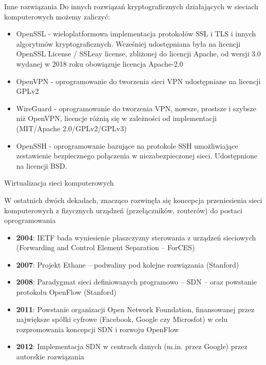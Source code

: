 \documentclass[aspectratio=169]{beamer}
\begin{document}
\begin{frame}{Inne rozwiązania}
    Do innych rozwiązań kryptograficznych działających w sieciach komputerowych możemy zaliczyć:
    \begin{itemize}
        \item OpenSSL - wieloplatformowa implementacja protokołów SSL i TLS i innych algorytmów kryptograficznych. Wcześniej udostępniana była na licencji OpenSSL License / SSLeay license, zbliżonej do licencji Apache, od wersji 3.0 wydanej w 2018 roku obowiązuje licencja Apache-2.0
        \item OpenVPN - oprogramowanie do tworzenia sieci VPN udostępniane na licencji GPLv2
        \item WireGuard - oprogramowanie do tworzenia VPN, nowsze, prostsze i szybsze niż OpenVPN, licencje różnią się w zależności od implementacji (MIT/Apache 2.0/GPLv2/GPLv3)
        \item OpenSSH - oprogramowanie bazujące na protokole SSH umożliwiające zestawienie bezpiecznego połączenia w niezabezpieczonej sieci. Udostępnione na licencji BSD.
    \end{itemize}
\end{frame}

\begin{frame}{Wirtualizacja sieci komputerowych}

W ostatnich dwóch dekadach, znacząco rozwinęła się koncepcja przeniesienia sieci komputerowych z fizycznych urządzeń (przełączników, routerów) do postaci oprogramowania
\begin{itemize}
    \item \textbf{2004}: IETF bada wyniesienie płaszczyzny sterowania z urządzeń sieciowych (Forwarding and Control Element Separation -- ForCES)
    \item \textbf{2007}: Projekt Ethane -- podwaliny pod kolejne rozwiązania (Stanford)
    \item \textbf{2008}: Paradygmat sieci definiowanych programowo -- SDN -- oraz powstanie protokołu OpenFlow (Stanford)
    \item \textbf{2011}: Powstanie organizacji Open Network Foundation, finansowanej przez największe spółki cyfrowe (Facebook, Google czy Microsfot) w celu rozpromowania koncepcji SDN i rozwoju OpenFlow
    \item \textbf{2012}: Implementacja SDN w centrach danych (m.in. przez Google) przez autorskie rozwiązania
    
\end{itemize}
\end{frame}
\end{document}
